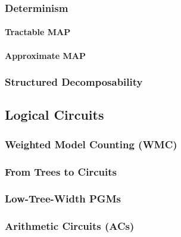 			\subsubsection{Determinism} %

				\paragraph{Tractable MAP} %

				\paragraph{Approximate MAP} %

			\subsubsection{Structured Decomposability} %

		\subsection{Logical Circuits} %

			\subsubsection{Weighted Model Counting (WMC)} %

			\subsubsection{From Trees to Circuits} %

			\subsubsection{Low-Tree-Width PGMs} %

			\subsubsection{Arithmetic Circuits (ACs)} %

